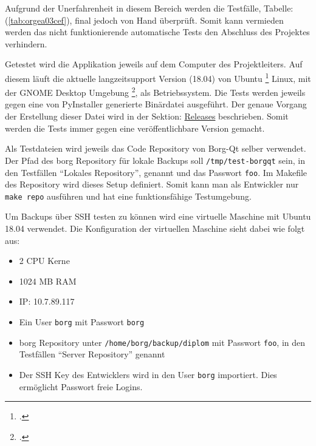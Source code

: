 Aufgrund der Unerfahrenheit in diesem Bereich werden die Testfälle,
Tabelle:(\ref{tab:orgea03cef}), final jedoch von Hand überprüft. Somit kann vermieden
werden das nicht funktionierende automatische Tests den Abschluss des Projektes
verhindern.

Getestet wird die Applikation jeweils auf dem Computer des Projektleiters. Auf
diesem läuft die aktuelle langzeitsupport Version (18.04) von Ubuntu
\footcite{ubuntu} Linux, mit der GNOME Desktop Umgebung \footcite{gnome}, als
Betriebssystem. Die Tests werden jeweils gegen eine von PyInstaller generierte
Binärdatei ausgeführt. Der genaue Vorgang der Erstellung dieser Datei wird in
der Sektion: \hyperref[sec:orgc187131]{Releases} beschrieben. Somit werden die Tests immer gegen eine
veröffentlichbare Version gemacht.

Als Testdateien wird jeweils das Code Repository von Borg-Qt selber verwendet.
Der Pfad des \gls{borg} Repository für lokale Backups soll \texttt{/tmp/test-borgqt}
sein, in den Testfällen "`Lokales Repository"', genannt und das Passwort \texttt{foo}.
Im Makefile des Repository wird dieses Setup definiert. Somit kann man als
Entwickler nur \texttt{make repo} ausführen und hat eine funktionsfähige Testumgebung.

Um Backups über SSH testen zu können wird eine virtuelle Maschine mit Ubuntu
18.04 verwendet. Die Konfiguration der virtuellen Maschine sieht dabei wie
folgt aus:
\begin{itemize}
\item 2 CPU Kerne
\item 1024 MB RAM
\item IP: 10.7.89.117
\item Ein User \texttt{borg} mit Passwort \texttt{borg}
\item \gls{borg} Repository unter \texttt{/home/borg/backup/diplom} mit Passwort \texttt{foo}, in
den Testfällen "`Server Repository"' genannt
\item Der SSH Key des Entwicklers wird in den User \texttt{borg} importiert. Dies
ermöglicht Passwort freie Logins.
\end{itemize}

